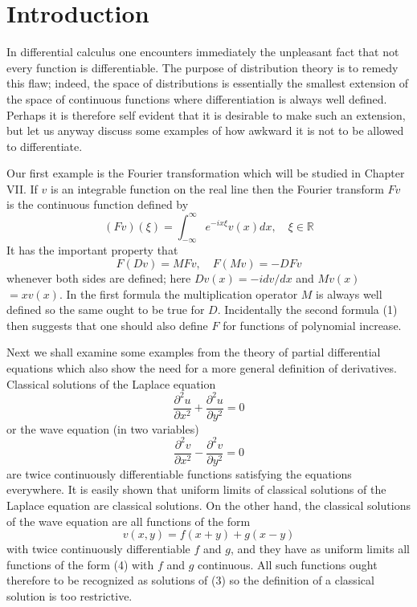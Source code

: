\chapter*{Introduction}
In differential calculus one encounters immediately the unpleasant fact that not every function is differentiable. The purpose of distribution theory is to remedy this flaw; indeed, the space of distributions is essentially the smallest extension of the space of continuous functions where differentiation is always well defined. Perhaps it is therefore self evident that it is desirable to make such an extension, but let us anyway discuss some examples of how awkward it is not to be allowed to differentiate.

Our first example is the Fourier transformation which will be studied in Chapter VII. If $v$ is an integrable function on the real line then the Fourier transform $F v$ is the continuous function defined by
\[
	(F v)(\xi)=\int_{-\infty}^{\infty} e^{-i x \xi} v(x) d x, \quad \xi \in \mathbb{R}
\]
It has the important property that
\begin{equation}
	F(D v)=M F v, \quad F(M v)=-D F v
\end{equation}
whenever both sides are defined; here $D v(x)=-i d v / d x$ and $M v(x)$ $=x v(x)$. In the first formula the multiplication operator $M$ is always well defined so the same ought to be true for $D$. Incidentally the second formula (1) then suggests that one should also define $F$ for functions of polynomial increase.

Next we shall examine some examples from the theory of partial differential equations which also show the need for a more general definition of derivatives. Classical solutions of the Laplace equation
\begin{equation}
	\frac{\partial^{2} u}{\partial x^{2}}+\frac{\partial^{2} u}{\partial y^{2}}=0
\end{equation}
or the wave equation (in two variables)
\begin{equation}
	\frac{\partial^{2} v}{\partial x^{2}}-\frac{\partial^{2} v}{\partial y^{2}}=0
\end{equation}
are twice continuously differentiable functions satisfying the equations everywhere. It is easily shown that uniform limits of classical solutions of the Laplace equation are classical solutions. On the other hand, the classical solutions of the wave equation are all functions of the form
\begin{equation}
	v(x, y)=f(x+y)+g(x-y)
\end{equation}
with twice continuously differentiable $f$ and $g$, and they have as uniform limits all functions of the form (4) with $f$ and $g$ continuous. All such functions ought therefore to be recognized as solutions of (3) so the definition of a classical solution is too restrictive.

